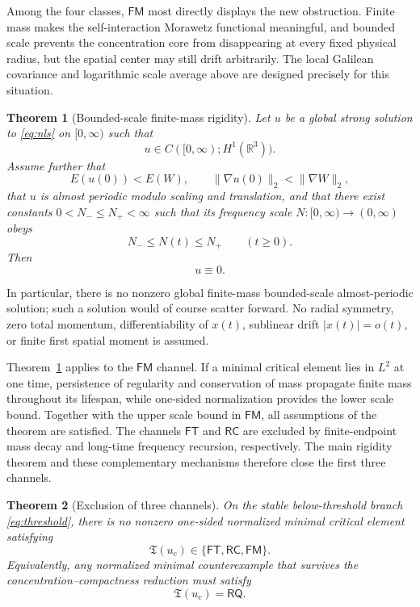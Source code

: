 \documentclass{interact}
\numberwithin{equation}{section}
\theoremstyle{plain}
\newtheorem{theorem}{Theorem}[section]
\theoremstyle{definition}
\theoremstyle{remark}
\newcommand{\R}{\mathbb R}
\begin{document}
Among the four classes, $\mathsf{FM}$ most directly displays the new obstruction. Finite mass makes the self-interaction Morawetz functional meaningful, and bounded scale prevents the concentration core from disappearing at every fixed physical radius, but the spatial center may still drift arbitrarily. The local Galilean covariance and logarithmic scale average above are designed precisely for this situation.

\begin{theorem}[Bounded-scale finite-mass rigidity]\label{thm:finite-mass-rigidity}
Let $u$ be a global strong solution to \eqref{eq:nls} on $[0,\infty)$ such that
\[
 u\in C([0,\infty);H^1(\R^3)).
\]
Assume further that
\begin{equation}\label{eq:main-threshold}
 E(u(0))<E(W),
 \qquad
 \|\nabla u(0)\|_2<\|\nabla W\|_2,
\end{equation}
that $u$ is almost periodic modulo scaling and translation, and that there exist constants $0<N_-\le N_+<\infty$ such that its frequency scale $N:[0,\infty)\to(0,\infty)$ obeys
\begin{equation}\label{eq:main-bounded-scale}
 N_-\le N(t)\le N_+
 \qquad(t\ge0).
\end{equation}
Then
\[
 u\equiv0.
\]
\end{theorem}

In particular, there is no nonzero global finite-mass bounded-scale almost-periodic solution; such a solution would of course scatter forward. No radial symmetry, zero total momentum, differentiability of $x(t)$, sublinear drift $|x(t)|=o(t)$, or finite first spatial moment is assumed.

Theorem~\ref{thm:finite-mass-rigidity} applies to the $\mathsf{FM}$ channel. If a minimal critical element lies in $L^2$ at one time, persistence of regularity and conservation of mass propagate finite mass throughout its lifespan, while one-sided normalization provides the lower scale bound. Together with the upper scale bound in $\mathsf{FM}$, all assumptions of the theorem are satisfied. The channels $\mathsf{FT}$ and $\mathsf{RC}$ are excluded by finite-endpoint mass decay and long-time frequency recursion, respectively. The main rigidity theorem and these complementary mechanisms therefore close the first three channels.

\begin{theorem}[Exclusion of three channels]\label{thm:closed-channels}
On the stable below-threshold branch \eqref{eq:threshold}, there is no nonzero one-sided normalized minimal critical element satisfying
\[
 \mathfrak T(u_c)\in\{\mathsf{FT},\mathsf{RC},\mathsf{FM}\}.
\]
Equivalently, any normalized minimal counterexample that survives the concentration--compactness reduction must satisfy
\[
 \mathfrak T(u_c)=\mathsf{RQ}.
\]
\end{theorem}
\end{document}
